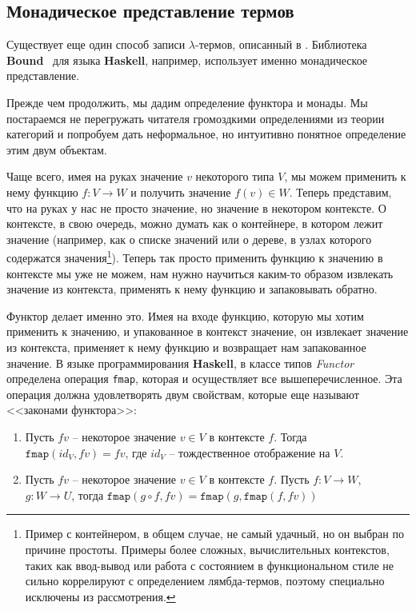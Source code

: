 \subsection{Монадическое представление термов}
\label{sec:monad}
Существует еще один способ записи $\lambda$-термов, описанный в \cite{bird1999bruijn}. Библиотека \textbf{Bound}~\cite{bound} для языка \textbf{Haskell}, например, использует именно монадическое представление.

Прежде чем продолжить, мы дадим определение функтора и монады. Мы постараемся не перегружать читателя громоздкими определениями из теории категорий и попробуем дать неформальное, но интуитивно понятное определение этим двум объектам.

Чаще всего, имея на руках значение $v$ некоторого типа $V$, мы можем применить к нему функцию $f : V \to W$ и получить значение $f(v) \in W$. Теперь представим, что на руках у нас не просто значение, но значение в некотором контексте. О контексте, в свою очередь, можно думать как о контейнере, в котором лежит значение (например, как о списке значений или о дереве, в узлах которого содержатся значения\footnote{Пример с контейнером, в общем случае, не самый удачный, но он выбран по причине простоты. Примеры более сложных, вычислительных контекстов, таких как ввод-вывод или работа с состоянием в функциональном стиле не сильно коррелируют с определением лямбда-термов, поэтому специально исключены из рассмотрения.}). Теперь так просто применить функцию к значению в контексте мы уже не можем, нам нужно научиться каким-то образом извлекать значение из контекста, применять к нему функцию и запаковывать обратно.

Функтор делает именно это. Имея на входе функцию, которую мы хотим применить к значению, и упакованное в контекст значение, он извлекает значение из контекста, применяет к нему функцию и возвращает нам запакованное значение. В языке программирования \textbf{Haskell}, в классе типов \textit{Functor} определена операция \texttt{fmap}, которая и осуществляет все вышеперечисленное. Эта операция должна удовлетворять двум свойствам, которые еще называют <<законами функтора>>:

\begin{enumerate}
  \item Пусть $fv$ -- некоторое значение $v \in V$ в контексте $f$. Тогда $\texttt{fmap}(id_{V}, fv) = fv$, где $id_{V}$ -- тождественное отображение на $V$.
  \item Пусть $fv$ -- некоторое значение $v \in V$ в контексте $f$. Пусть $f : V \to W$, $g : W \to U$, тогда $\texttt{fmap}(g \circ f, fv) = \texttt{fmap}(g, \texttt{fmap}(f, fv))$
\end{enumerate}

